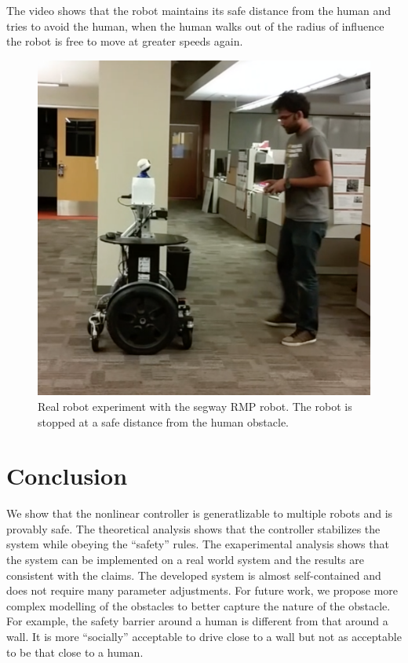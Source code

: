 \documentclass[journal]{IEEEconf}
\begin{document}
The video shows that the robot maintains its safe distance from the human and tries to avoid the human, when the human walks out of the radius of influence the robot is free to move at greater speeds again.
\begin{figure}[h!]
\centering
\includegraphics[scale=0.13]{jeeves_exp.png} 
\caption{Real robot experiment with the segway RMP robot. The robot is stopped at a safe distance from the human obstacle. \label{fig:jeeves_exp}}
\end{figure}

\section{Conclusion}
We show that the nonlinear controller is generatlizable to multiple robots and is provably safe. The theoretical analysis shows that the controller stabilizes the system while obeying the ``safety'' rules. The exaperimental analysis shows that the system can be implemented on a real world system and the results are consistent with the claims. The developed system is almost self-contained and does not require many parameter adjustments. 
For future work, we propose more complex modelling of the obstacles to better capture the nature of the obstacle. For example, the safety barrier around a human is different from that around a wall. It is more ``socially'' acceptable to drive close to a wall but not as acceptable to be that close to a human.




\end{document}
